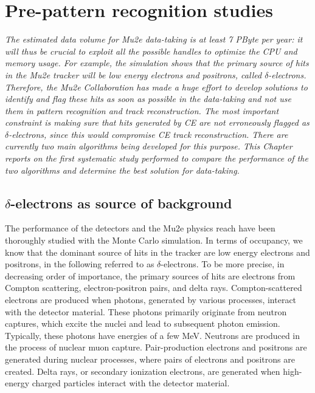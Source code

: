 \chapter{Pre-pattern recognition studies}\label{delta}
\textit{
The estimated data volume for Mu2e data-taking 
is at least 7 PByte per year: it will thus be crucial to 
exploit all the possible handles to optimize 
the CPU and memory usage. For example, the simulation 
shows that the primary source of hits in the 
Mu2e tracker will be low energy electrons and positrons, called $\delta$-electrons. 
Therefore, the Mu2e Collaboration has made 
a huge effort to develop solutions to identify 
and flag these hits as soon as possible in the 
data-taking and not use them in pattern 
recognition and track reconstruction. 
The most important constraint is 
making sure that hits generated by CE are 
not erroneously flagged as $\delta$-electrons, 
since this would compromise CE track reconstruction. 
There are currently two main algorithms being 
developed for this purpose. This Chapter reports 
on the first systematic study performed to compare 
the performance of the two algorithms and determine 
the best solution for data-taking. }



\section{$\delta$-electrons as source of background}

The performance of the detectors and the Mu2e 
physics reach have been thoroughly studied with 
the Monte Carlo simulation. In terms of 
occupancy, we know that the dominant 
source of hits in the tracker are low energy electrons and positrons,
in the following referred to as  
$\delta$-electrons. To be more precise, in 
decreasing order of importance, the primary sources of hits are 
electrons from Compton scattering, electron-positron pairs, 
and delta rays. Compton-scattered electrons are produced 
when photons, generated by various processes, 
interact with the detector material. These photons primarily 
originate from neutron captures, which excite the 
nuclei and lead  
to subsequent photon emission. Typically, 
these photons have 
energies of a few MeV. Neutrons are 
produced in the process of nuclear muon capture. Pair-production 
electrons and positrons are 
generated during nuclear  
processes, where pairs of electrons 
and positrons are created.
Delta rays, 
or secondary ionization electrons, 
are generated when high-energy 
charged particles interact with the detector material.


